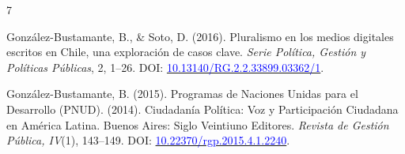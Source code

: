 \begin{publications}
\begin{benumerate}{7}
\item{González-Bustamante, B., \& Soto, D. (2016). Pluralismo en los medios digitales escritos en Chile, una exploración de casos clave. {\itshape Serie Política, Gestión y Políticas Públicas}, 2, 1--26. DOI: \href{http://doi.org/10.13140/RG.2.2.33899.03362/1}{\textcolor{blue}{10.13140/RG.2.2.33899.03362/1}}.}\vspace{1mm}

\item{González-Bustamante, B. (2015). Programas de Naciones Unidas para el Desarrollo (PNUD). (2014). Ciudadanía Política: Voz y Participación Ciudadana en América Latina. Buenos Aires: Siglo Veintiuno Editores. {\itshape Revista de Gestión Pública, IV}(1), 143--149. DOI: \href{https://doi.org/10.22370/rgp.2015.4.1.2240}{\textcolor{blue}{10.22370/rgp.2015.4.1.2240}}.}

\end{benumerate}

\end{publications}
